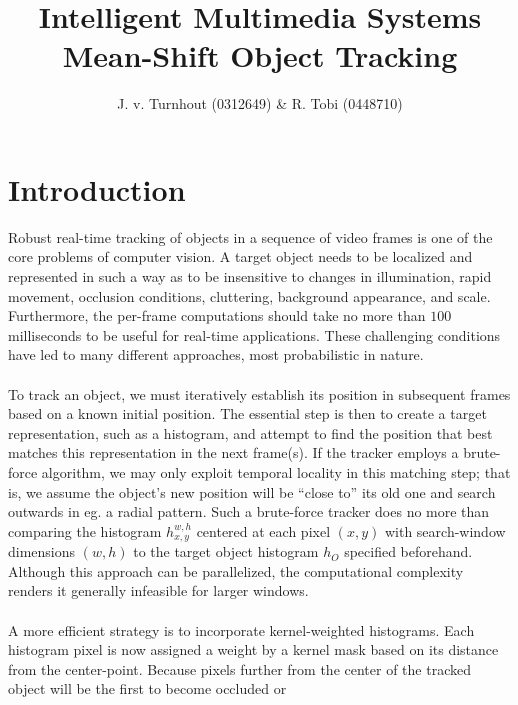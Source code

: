 \documentclass[a4paper,11pt]{article}
\title{Intelligent Multimedia Systems\\Mean-Shift Object Tracking}
\author{J. v. Turnhout (0312649) \& R. Tobi (0448710)}
\begin{document}
	\maketitle


	\section*{Introduction}
		Robust real-time tracking of objects in a sequence of video frames is one of
		the core problems of computer vision. A target object needs to be localized
		and represented in such a way as to be insensitive to changes in illumination,
		rapid movement, occlusion conditions, cluttering, background appearance, and
		scale. Furthermore, the per-frame computations should take no more than $100$
		milliseconds to be useful for real-time applications. These challenging
		conditions have led to many different approaches, most probabilistic in
		nature.
		\\ \\
		To track an object, we must iteratively establish its position in subsequent
		frames based on a known initial position. The essential step is then to create
		a target representation, such as a histogram, and attempt to find the position
		that best matches this representation in the next frame(s). If the tracker
		employs a brute-force algorithm, we may only exploit temporal locality in
		this matching step; that is, we assume the object's new position will be
		``close to'' its old one and search outwards in eg. a radial pattern. Such
		a brute-force tracker does no more than comparing the histogram $h_{x,y}^{w,h}$
		centered at each pixel $(x, y)$ with search-window dimensions $(w, h)$ to
		the target object histogram $h_{O}$ specified beforehand. Although this
		approach can be parallelized, the computational complexity renders it
		generally infeasible for larger windows.
		\\ \\
		A more efficient strategy is to incorporate kernel-weighted histograms.
		Each histogram pixel is now assigned a weight by a kernel mask based on
		its distance from the center-point. Because pixels further from the
		center of the tracked object will be the first to become occluded or
\end{document}
